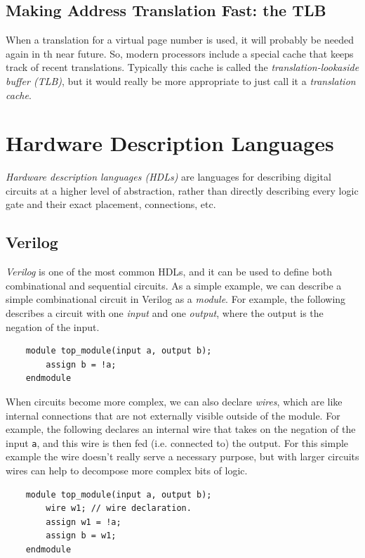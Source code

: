 \documentclass[10pt,a4paper]{article}
\begin{document}
\subsection{Making Address Translation Fast: the TLB}

When a translation for a virtual page number is used, it will probably be needed again in th near future. So, modern processors include a special cache that keeps track of recent translations. Typically this cache is called the \textit{translation-lookaside buffer (TLB)}, but it would really be more appropriate to just call it a \textit{translation cache}.
 
\section{Hardware Description Languages}


\textit{Hardware description languages (HDLs)} are languages for describing digital circuits at a higher level of abstraction, rather than directly describing every logic gate and their exact placement, connections, etc. 

\subsection*{Verilog}

\textit{Verilog} is one of the most common HDLs, and it can be used to define both combinational and sequential circuits. As a simple example, we can describe a simple combinational circuit in Verilog as a \textit{module}. For example, the following describes a circuit with one \textit{input} and one \textit{output}, where the output is the negation of the input.
\begin{verbatim}
    module top_module(input a, output b);
        assign b = !a;
    endmodule
\end{verbatim}
When circuits become more complex, we can also declare \textit{wires}, which are like internal connections that are not externally visible outside of the module. For example, the following declares an internal wire that takes on the negation of the input \verb|a|, and this wire is then fed (i.e. connected to) the output. For this simple example the wire doesn't really serve a necessary purpose, but with larger circuits wires can help to decompose more complex bits of logic.
\begin{verbatim}
    module top_module(input a, output b);
        wire w1; // wire declaration.
        assign w1 = !a;
        assign b = w1;
    endmodule
\end{verbatim}
\end{document}
